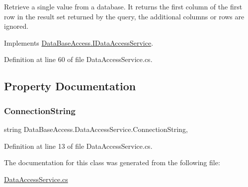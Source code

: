 Retrieve a single value from a database. It returns the first column of the first row in the result set returned by the query, the additional columns or rows are ignored. 



Implements \mbox{\hyperlink{interfaceDataBaseAccess_1_1IDataAccessService_a0788e764e3f4418039d73291b8c7e87c}{Data\+Base\+Access.\+I\+Data\+Access\+Service}}.



Definition at line 60 of file Data\+Access\+Service.\+cs.



\subsection{Property Documentation}
\mbox{\label{classDataBaseAccess_1_1DataAccessService_a68fdde0329f29760ea79961cb70da656}} 
\subsubsection{\texorpdfstring{ConnectionString}{ConnectionString}}
{\footnotesize\ttfamily string Data\+Base\+Access.\+Data\+Access\+Service.\+Connection\+String\hspace{0.3cm}{\ttfamily [get]}, {}}







Definition at line 13 of file Data\+Access\+Service.\+cs.



The documentation for this class was generated from the following file\+:\begin{DoxyCompactItemize}
\item 
\mbox{\hyperlink{DataAccessService_8cs}{Data\+Access\+Service.\+cs}}\end{DoxyCompactItemize}
